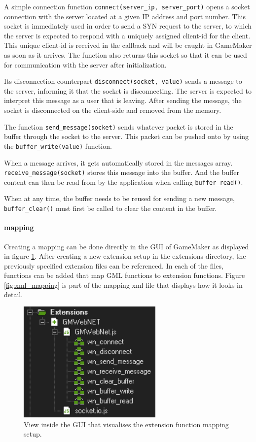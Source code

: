 \documentclass[bsc,frontabs,twoside,singlespacing,parskip,deptreport]{infthesis}     %
\begin{document}
A simple connection function \texttt{connect(server\_ip, server\_port)} opens a socket connection with the server located at a given IP address and port number.
This socket is immediately used in order to send a SYN request to the server, to which the server is expected to respond with a uniquely assigned client-id for the client. This unique client-id is received in the callback and will be caught in GameMaker as soon as it arrives.
The function also returns this socket so that it can be used for communication with the server after initialization.

Its disconnection counterpart \texttt{disconnect(socket, value)} sends a message to the server, informing it that the socket is disconnecting. The server is expected to interpret this message as a user that is leaving.
After sending the message, the socket is disconnected on the client-side and removed from the memory.

The function \texttt{send\_message(socket)} sends whatever packet is stored in the buffer through the socket to the server.
This packet can be pushed onto by using the \texttt{buffer\_write(value)} function.

When a message arrives, it gets automatically stored in the messages array. \texttt{receive\_message(socket)} stores this message into the buffer. And the buffer content can then be read from by the application when calling \texttt{buffer\_read()}.

When at any time, the buffer needs to be reused for sending a new message, \texttt{buffer\_clear()} must first be called to clear the content in the buffer. 

\paragraph*{mapping}
Creating a mapping can be done directly in the GUI of GameMaker as displayed in figure \ref{fig:extension_folder}. After creating a new extension setup in the extensions directory, the previously specified extension files can be referenced. In each of the files, functions can be added that map GML functions to extension functions. Figure \ref{fig:xml_mapping} is part of the mapping xml file that displays how it looks in detail.

\begin{figure}[H]
\centering
\includegraphics[scale=1.2]{images/extensions_folder.png}
\caption{View inside the GUI that visualises the extension function mapping setup.}
\label{fig:extension_folder}
\vspace{1em}
\end{figure}
\end{document}
